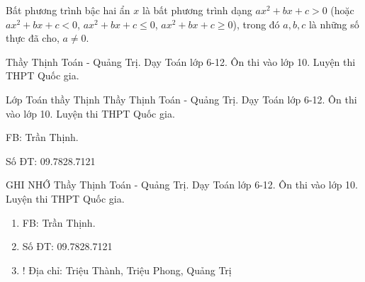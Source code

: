 \begin{tomtat}
\begin{dn}
	Bất phương trình bậc hai ẩn $x$ là bất phương trình dạng $ax^2+bx+c>0$ (hoặc $ax^2+bx+c<0$, $ax^2+bx+c\le 0$,  $ax^2+bx+c\ge 0$), trong đó $a,b,c$ là những số thực đã cho, $a\ne 0$.
\end{dn}
\lipsum[4]
\begin{ghichu}
	Thầy Thịnh Toán - Quảng Trị. Dạy Toán lớp 6-12. Ôn thi vào lớp 10. Luyện thi THPT Quốc gia.
\end{ghichu}
\begin{khung4}{Lớp Toán thầy Thịnh}
	Thầy Thịnh Toán - Quảng Trị. Dạy Toán lớp 6-12. Ôn thi vào lớp 10. Luyện thi THPT Quốc gia.
	\begin{listEX}[2]
		\item FB: Trần Thịnh.
		\item Số ĐT: 09.7828.7121
	\end{listEX}
\end{khung4}
\lipsum[4]
\begin{noidung}{GHI NHỚ 
	}
	Thầy Thịnh Toán - Quảng Trị. Dạy Toán lớp 6-12. Ôn thi vào lớp 10. Luyện thi THPT Quốc gia.
	\begin{enumerate}[\itemCI]
		\item FB: Trần Thịnh.
		\item Số ĐT: 09.7828.7121
		\item! Địa chỉ: Triệu Thành, Triệu Phong, Quảng Trị
	\end{enumerate}
\end{noidung}
\end{tomtat}


